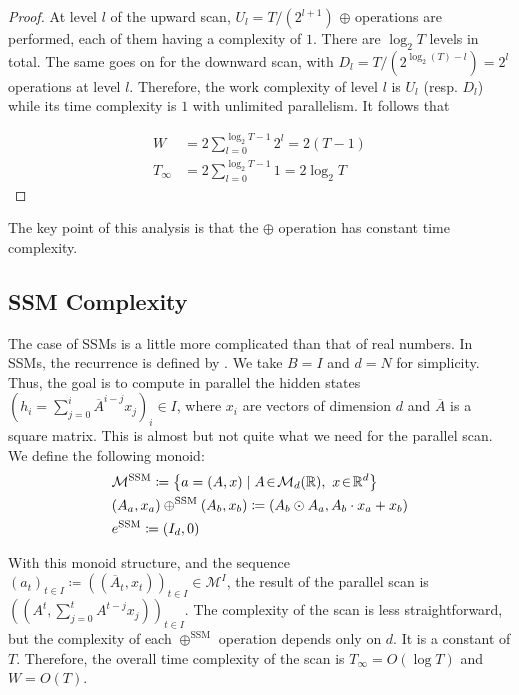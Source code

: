 \documentclass{article}
\begin{document}
\begin{proof}
At level $l$ of the upward scan, $U_l = T/(2^{l+1})$ $\oplus$ operations are performed, each of them having a complexity of $1$. There are $\log_2 T$ levels in total. The same goes on for the downward scan, with $D_l = T/(2^{\log_2(T) - l})=2^{l}$ operations at level $l$. Therefore, the work complexity of level $l$ is $U_l$ (resp. $D_l$) while its time complexity is $1$ with unlimited parallelism. It follows that

\begin{align}
\label{eq:W_integer}
W &= 2\sum_{l=0}^{\log_2 T-1}2^l=2(T-1)\\
\label{eq:T_integer}
T_\infty&= 2\sum_{l=0}^{\log_2 T-1}1=2\log_2T
\end{align}
\end{proof}

The key point of this analysis is that the $\oplus$ operation has constant time complexity.

\subsection{SSM Complexity}
\label{app:SSM_complexity}

The case of SSMs is a little more complicated than that of real numbers. In SSMs, the recurrence is defined by . We take $B = I$ and $d = N$ for simplicity. Thus, the goal is to compute in parallel the hidden states $(h_i = \sum_{j=0}^i\overline{A}^{i-j}x_j)_i\in I$, where $x_i$ are vectors of dimension $d$ and $\overline{A}$ is a square matrix. This is almost but not quite what we need for the parallel scan. We define the following monoid:
\begin{align}
\label{eq:M_SSM}
    &\mathcal{M}^{\mathrm{SSM}}\coloneqq \left\{a = (A, x)\mid A\!\in\!\mathcal{M}_{d}(\mathbb{R}),~x\!\in\!\mathbb{R}^d\right\}\\
\label{eq:+_SSM}
    &(A_a, x_a) \oplus^{\mathrm{SSM}} (A_b,x_b)\coloneqq (A_b \odot A_a, A_b \cdot x_a + x_b)\\
\label{eq:0_SSM}
    &e^{\mathrm{SSM}}\coloneqq(I_d, 0)
\end{align}

With this monoid structure, and the sequence $(a_t)_{t\in I} \coloneqq ((\overline{A}_t, x_t))_{t\in I} \in \mathcal{M}^I$, the result of the parallel scan is $((A^t, \sum_{j=0}^tA^{t-j}x_j))_{t\in I}$. The complexity of the scan is less straightforward, but the complexity of each $\oplus^{\mathrm{SSM}}$ operation depends only on $d$. It is a constant of $T$. Therefore, the overall time complexity of the scan is $T_\infty= O(\log T)$ and $W=O(T)$.
\end{document}
